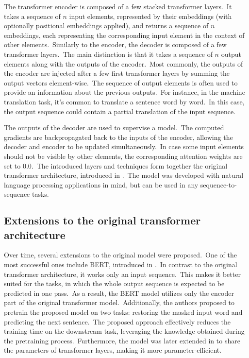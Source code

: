 \documentclass[longabstract, english, mgr]{iithesis}
\theoremstyle{default_theorem_style}\newtheorem{theorem}{Theorem}
\theoremstyle{default_theorem_style}\newtheorem{definition}{Definition}
\begin{document}
\noindent The transformer encoder is composed of a few stacked transformer layers.\ It takes a sequence of
$n$ input elements, represented by their embeddings (with optionally positional embeddings applied), and returns a
sequence of $n$ embeddings, each representing the corresponding input element in the context of other
elements.\ Similarly to the encoder, the decoder is composed of a few transformer layers.\ The main distinction is
that it takes a sequence of $n$ output elements along with the outputs of the encoder.\ Most commonly,
the outputs of the encoder are injected after a few first transformer layers by summing the output vectors
element-wise.\ The sequence of output elements is often used to provide an information about the previous
outputs.\ For instance, in the machine translation task, it's common to translate a sentence word by word.\ In this
case, the output sequence could contain a partial translation of the input sequence.\newline

\noindent The outputs of the decoder are used to supervise a model.\ The computed gradients are backpropagated
back to the inputs of the encoder, allowing the decoder and encoder to be updated simultaneously.\ In case some
input elements should not be visible by other elements, the corresponding attention weights are set to $0.0$.\ The
introduced layers and techniques form together the original transformer architecture, introduced in
\cite{transformer_model}.\ The model was developed with natural language processing applications in mind, but
can be used in any sequence-to-sequence tasks.

\subsection{Extensions to the original transformer architecture} \label{subsec:transformer_extensions}

Over time, several extensions to the original model were proposed.\ One of the most successful ones include BERT,
introduced in \cite{bert_model}.\ In contrast to the original transformer architecture, it works only
an input sequence.\ This makes it better suited for the tasks, in which the whole output sequence is expected
to be predicted in one pass.\ As a result, the BERT model utilizes only the encoder part of the original transformer
model.\ Additionally, the authors proposed to pretrain the proposed model on two tasks: restoring the masked input
word and predicting the next sentence.\ The proposed approach effectively reduces the training time on the downstream
task, leveraging the knowledge obtained during the pretraining process.\ Furthermore, the model was later
extended in \cite{albert_model} to share the parameters of transformer layers, making it more
parameter-efficient.
\end{document}
